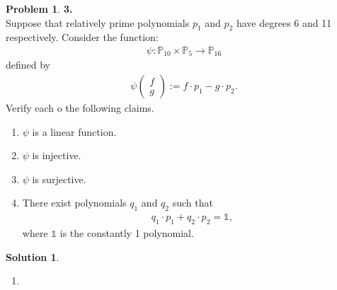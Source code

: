 \documentclass{book}
\theoremstyle{definition}
\newtheorem*{prob*}{Problem}
\newtheorem*{sln*}{Solution}
\begin{document}
\begin{prob*}\textbf{3. }\\ 
	
	Suppose that relatively prime polynomials $p_1$ and $p_2$ have degrees 6 and 11 respectively. Consider the function:
	\begin{align*}
	\psi : \mathbb{P}_{10} \times \mathbb{P}_5 \to \mathbb{P}_{16}
	\end{align*}
	defined by
	\begin{align*}
	\psi \begin{pmatrix}
	f\\g
	\end{pmatrix} := f \cdot p_1 - g \cdot p_2.
	\end{align*}
	Verify each o the following claims.
	\begin{enumerate}
		\item $\psi$ is a linear function.
		\item $\psi$ is injective.
		\item $\psi$ is surjective.
		\item There exist polynomials $q_1$ and $q_2$ such that
		\begin{align*}
		q_1 \cdot p_1 + q_2 \cdot p_2 = \mathbb{1},
		\end{align*}
		where $\mathbb{1}$ is the constantly 1 polynomial.
	\end{enumerate}



\begin{sln*}
	$\,$\\
	\begin{enumerate}
		\item 
	

\end{enumerate}
\end{sln*}
\end{prob*}
\end{document}
